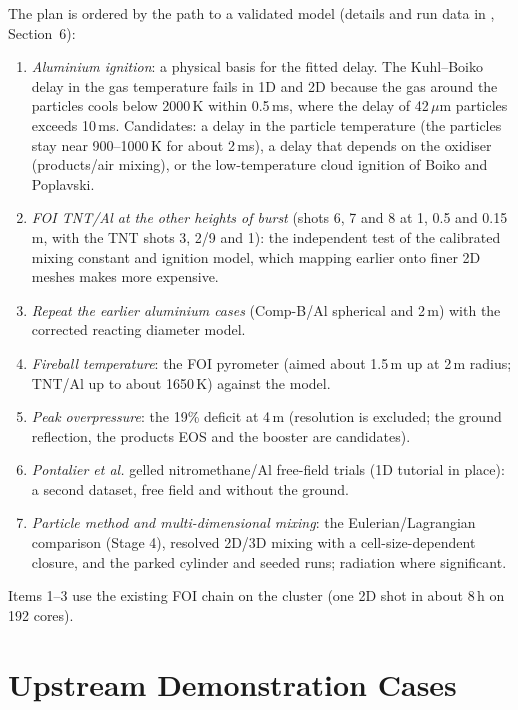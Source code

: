 \documentclass{article}
\begin{document}
The plan is ordered by the path to a validated model (details and run data in , Section~6):
\begin{enumerate}
    \item \emph{Aluminium ignition}: a physical basis for the fitted delay. The Kuhl--Boiko delay in the gas temperature fails in 1D and 2D because the gas around the particles cools below 2000\,K within 0.5\,ms, where the delay of 42\,$\mu$m particles exceeds 10\,ms. Candidates: a delay in the particle temperature (the particles stay near 900--1000\,K for about 2\,ms), a delay that depends on the oxidiser (products/air mixing), or the low-temperature cloud ignition of Boiko and Poplavski.
    \item \emph{FOI TNT/Al at the other heights of burst} (shots 6, 7 and 8 at 1, 0.5 and 0.15\,m, with the TNT shots 3, 2/9 and 1): the independent test of the calibrated mixing constant and ignition model, which mapping earlier onto finer 2D meshes makes more expensive.
    \item \emph{Repeat the earlier aluminium cases} (Comp-B/Al spherical and 2\,m) with the corrected reacting diameter model.
    \item \emph{Fireball temperature}: the FOI pyrometer (aimed about 1.5\,m up at 2\,m radius; TNT/Al up to about 1650\,K) against the model.
    \item \emph{Peak overpressure}: the 19\% deficit at 4\,m (resolution is excluded; the ground reflection, the products EOS and the booster are candidates).
    \item \emph{Pontalier et al.} gelled nitromethane/Al free-field trials (1D tutorial in place): a second dataset, free field and without the ground.
    \item \emph{Particle method and multi-dimensional mixing}: the Eulerian/Lagrangian comparison (Stage 4), resolved 2D/3D mixing with a cell-size-dependent closure, and the parked cylinder and seeded runs; radiation where significant.
\end{enumerate}
Items 1--3 use the existing FOI chain on the cluster (one 2D shot in about 8\,h on 192 cores).

\appendix

\section{Upstream Demonstration Cases}
\label{app:tutorials}
\end{document}
